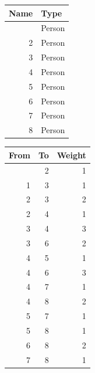 \documentclass[
  letterpaper,
  DIV=11,
  numbers=noendperiod,
  oneside]{scrreprt}
\begin{document}
\begin{table}

\caption{\label{tbl-example-participant-nodes}Sample person-person
network data}\begin{minipage}[t]{0.50\linewidth}

{\centering 

\begin{longtable}{rl}
\tabularnewline

\toprule
Name & Type \\ 
\midrule\addlinespace[2.5pt]
1 & Person \\ 
2 & Person \\ 
3 & Person \\ 
4 & Person \\ 
5 & Person \\ 
6 & Person \\ 
7 & Person \\ 
8 & Person \\ 
\bottomrule
\end{longtable}

}

\end{minipage}%
%
\begin{minipage}[t]{0.50\linewidth}

{\centering 

\begin{longtable}{rrr}
\tabularnewline

\toprule
From & To & Weight \\ 
\midrule\addlinespace[2.5pt]
1 & 2 & 1 \\ 
1 & 3 & 1 \\ 
2 & 3 & 2 \\ 
2 & 4 & 1 \\ 
3 & 4 & 3 \\ 
3 & 6 & 2 \\ 
4 & 5 & 1 \\ 
4 & 6 & 3 \\ 
4 & 7 & 1 \\ 
4 & 8 & 2 \\ 
5 & 7 & 1 \\ 
5 & 8 & 1 \\ 
6 & 8 & 2 \\ 
7 & 8 & 1 \\ 
\bottomrule
\end{longtable}

}

\end{minipage}%

\end{table}
\end{document}
